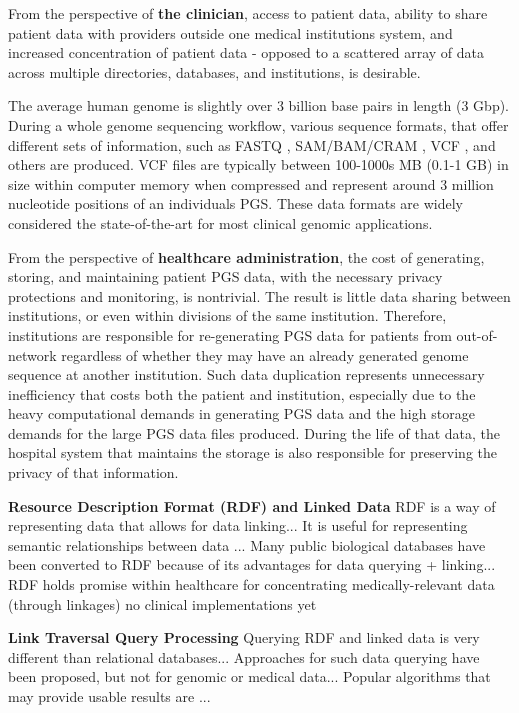 \documentclass[runningheads]{llncs}
\begin{document}
From the perspective of \textbf{the clinician}, access to patient data, ability to share patient data with providers outside one medical institution\textquotesingle s system, and increased concentration of patient data - opposed to a scattered array of data across multiple directories, databases, and institutions, is desirable. 

The average human genome is slightly over 3 billion base pairs in length (3 Gbp). 
During a whole genome sequencing workflow, various sequence formats, that offer different sets of information, such as FASTQ \cite{cock_sanger_2010}, SAM/BAM/CRAM \cite{li_sequence_2009, bonfield_cram_2022}, VCF \cite{danecek_variant_2011}, and others are produced. 
VCF files are typically between 100-1000s MB (0.1-1 GB) in size within computer memory when compressed and represent around 3 million nucleotide positions of an individual\textquotesingle s PGS. 
These data formats are widely considered the state-of-the-art for most clinical genomic applications.

From the perspective of \textbf{healthcare administration}, the cost of generating, storing, and maintaining patient PGS data, with the necessary privacy protections and monitoring, is nontrivial. 
The result is little data sharing between institutions, or even within divisions of the same institution.
Therefore, institutions are responsible for re-generating PGS data for patients from out-of-network regardless of whether they may have an already generated genome sequence at another institution. 
Such data duplication represents unnecessary inefficiency that costs both the patient and institution, especially due to the heavy computational demands in generating PGS data and the high storage demands for the large PGS data files produced. 
During the life of that data, the hospital system that maintains the storage is also responsible for preserving the privacy of that information. 



\textbf{Resource Description Format (RDF) and Linked Data}
RDF is a way of representing data that allows for data linking...
It is useful for representing semantic relationships between data ...
Many public biological databases have been converted to RDF because of its advantages for data querying + linking...
RDF holds promise within healthcare for concentrating medically-relevant data (through linkages)
no clinical implementations yet

\textbf{Link Traversal Query Processing}
Querying RDF and linked data is very different than relational databases...
Approaches for such data querying have been proposed, but not for genomic or medical data...
Popular algorithms that may provide usable results are ...
\end{document}
